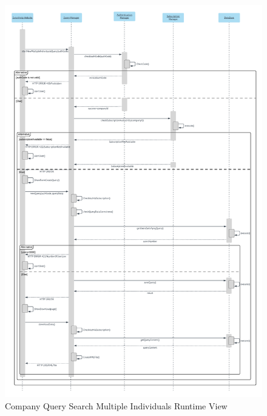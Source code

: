 \begin{figure}[H]

	\includegraphics[width=\textwidth,height=\textheight,keepaspectratio]{assets/flowCharts/CompanyQuerySearchMultipleIndividuals.pdf}
	\caption{Company Query Search Multiple Individuals Runtime View}
	\label{fig:CompanyQuerySearchMultipleIndividuals}
\end{figure}

